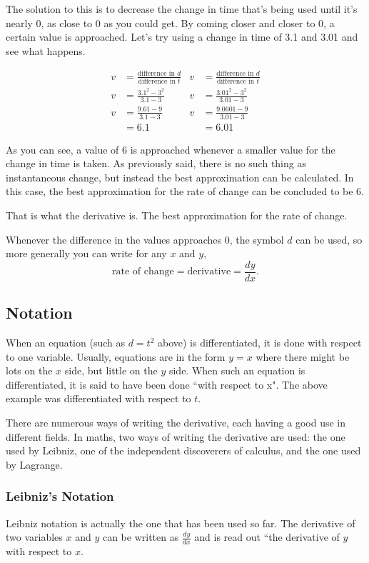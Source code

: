 The solution to this is to decrease the change in time that's being used until it's nearly $0$, as close to $0$ as you could get. By coming closer and closer to 0, a certain value is approached. Let's try using a change in time of 3.1 and 3.01 and see what happens.

\begin{align*}
	v&=\frac{\text{difference in $d$}}{\text{difference in $t$}} & v&=\frac{\text{difference in $d$}}{\text{difference in $t$}}\\[0.75em]
	v &= \frac{3.1^2 - 3^2}{3.1-3} & v &= \frac{3.01^2 - 3^2}{3.01-3}\\[0.75em]
	v &= \frac{9.61-9}{3.1-3} & v &= \frac{9.0601-9}{3.01-3}\\
	&= 6.1 & &= 6.01
\end{align*}

As you can see, a value of $6$ is approached whenever a smaller value for the change in time is taken. As previously said, there is no such thing as instantaneous change, but instead the best approximation can be calculated. In this case, the best approximation for the rate of change can be concluded to be $6$.

That is what the derivative is. The best approximation for the rate of change.

Whenever the difference in the values approaches $0$, the symbol $d$ can be used, so more generally you can write for any $x$ and $y$,
\begin{equation}
	\text{rate of change} = \text{derivative} = \frac{dy}{dx}\text{.}
\end{equation}

\subsection{Notation}
When an equation (such as $d=t^2$ above) is differentiated, it is done with respect to one variable. Usually, equations are in the form $y=x$ where there might be lots on the $x$ side, but little on the $y$ side. When such an equation is differentiated, it is said to have been done ``with respect to x". The above example was differentiated with respect to $t$.

There are numerous ways of writing the derivative, each having a good use in different fields. In maths, two ways of writing the derivative are used: the one used by Leibniz, one of the independent discoverers of calculus, and the one used by Lagrange.

\subsubsection{Leibniz's Notation}
Leibniz notation is actually the one that has been used so far. The derivative of two variables $x$ and $y$ can be written as $\frac{dy}{dx}$ and is read out ``the derivative of $y$ with respect to $x$.
